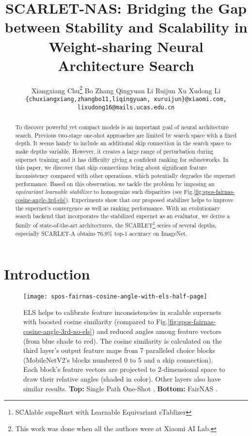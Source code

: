 \documentclass[10pt,twocolumn,letterpaper]{article}
\theoremstyle{definition}
\begin{document}
\title{SCARLET-NAS: Bridging the Gap between Stability and Scalability in Weight-sharing Neural Architecture Search}

\author{
Xiangxiang Chu\thanks{This work was done when all the authors were at Xiaomi AI Lab.} \quad Bo Zhang \quad Qingyuan Li \quad Ruijun Xu \quad Xudong Li \\
{\small \tt \{chuxiangxiang,zhangbo11,liqingyuan, xuruijun\}@xiaomi.com, lixudong16@mails.ucas.edu.cn}
}


\maketitle
\ificcvfinal\thispagestyle{empty}\fi

\begin{abstract}
To discover powerful yet compact models is an important goal of neural architecture search. Previous two-stage one-shot approaches are limited by search space with a fixed depth. It seems handy to include an additional skip connection in the search space to make depths variable. However, it creates a large range of perturbation during supernet training and it has difficulty giving a confident ranking for subnetworks. In this paper, we discover that skip connections bring about significant feature inconsistency compared with other operations, which potentially degrades the supernet performance. Based on this observation, we tackle the problem by imposing an \emph{equivariant learnable stabilizer} to homogenize such disparities (see Fig.\ref{fig:spos-fairnas-cosine-angle-3rd-els}).  Experiments show that our proposed stabilizer helps to improve the supernet's convergence as well as ranking performance. With an evolutionary search backend that incorporates the stabilized supernet as an evaluator, we derive a family of state-of-the-art architectures, the SCARLET\footnote{SCAlable supeRnet with Learnable Equivariant sTablizer} series  of several depths, especially SCARLET-A obtains 76.9\% top-1 accuracy on ImageNet. 
\end{abstract}



\section{Introduction}

\begin{figure}[ht]
	\centering
	\texttt{[image: spos-fairnas-cosine-angle-with-els-half-page]}
	\caption{ELS helps to calibrate feature inconsistencies in scalable supernets with boosted cosine similarity (compared to Fig.\ref{fig:spos-fairnas-cosine-angle-3rd-no-els}) and reduced angles among feature vectors (from blue shade to red). The cosine similarity is calculated on the third layer's output feature maps from 7 paralleled choice blocks (MobileNetV2's blocks numbered 0 to 5 and a skip connection). Each block's feature vectors are projected to 2-dimensional space  to draw  their relative angles (shaded in color). Other layers also have similar results. \textbf{Top:} Single Path One-Shot \protect\cite{guo2019single}, \textbf{Bottom:} FairNAS \protect\cite{chu2019fairnas}.}
	\label{fig:spos-fairnas-cosine-angle-3rd-els}
\end{figure} 
\end{document}
